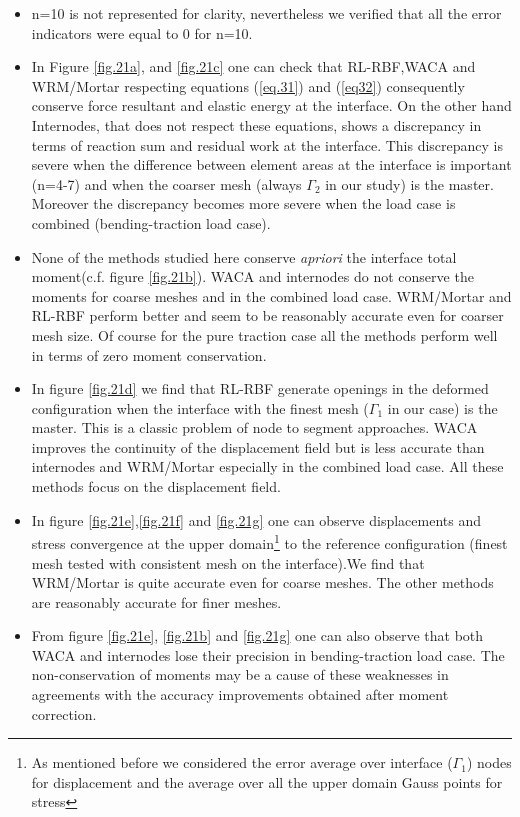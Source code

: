  \begin{itemize}
     \item n=10 is not represented for clarity, nevertheless we verified that all the error indicators were equal to 0 for n=10.
     \item In Figure  \ref{fig.21a}, and \ref{fig.21c} one can check that RL-RBF,WACA and WRM/Mortar respecting equations (\ref{eq.31}) and (\ref{eq32}) consequently conserve force resultant and elastic energy at the interface. On the other hand Internodes, that does not respect these equations, shows a discrepancy in terms of reaction sum and residual work at the interface. This discrepancy is severe when the difference between element areas at the interface is important (n=4-7) and when the coarser mesh (always $\Gamma_2$ in our study) is the master. Moreover the discrepancy becomes more severe when the load case is combined (bending-traction load case).
     \item None of the methods studied here conserve \textit{apriori} the interface total moment(c.f. figure \ref{fig.21b}). WACA and internodes do not conserve the moments for coarse meshes and in the combined load case. WRM/Mortar and RL-RBF perform better and seem to be reasonably accurate even for coarser mesh size. Of course for the pure traction case all the methods perform well in terms of zero moment conservation.
     \item In figure \ref{fig.21d} we find that RL-RBF generate openings in the deformed configuration when the interface with the finest mesh ($\Gamma_1$ in our case) is the master. This is a classic problem of node to segment approaches. WACA improves the continuity of the displacement field but is less accurate than internodes and WRM/Mortar especially in the combined load case. All these methods focus on the displacement field. 
     \item In figure \ref{fig.21e},\ref{fig.21f} and \ref{fig.21g} one can observe displacements and stress convergence at the upper domain\footnote{As mentioned before we considered the error average over interface ($\Gamma_1$) nodes for displacement and the average over all the upper domain Gauss points for stress} to the reference configuration (finest mesh tested with consistent mesh on the interface).We find that WRM/Mortar is quite accurate even for coarse meshes. The other methods are reasonably accurate for finer meshes.
     \item From figure \ref{fig.21e}, \ref{fig.21b} and \ref{fig.21g} one can also observe that both WACA and internodes lose their precision in bending-traction load case. The non-conservation of moments may be a cause of these weaknesses in agreements with the accuracy improvements obtained after moment correction.

\end{itemize}
